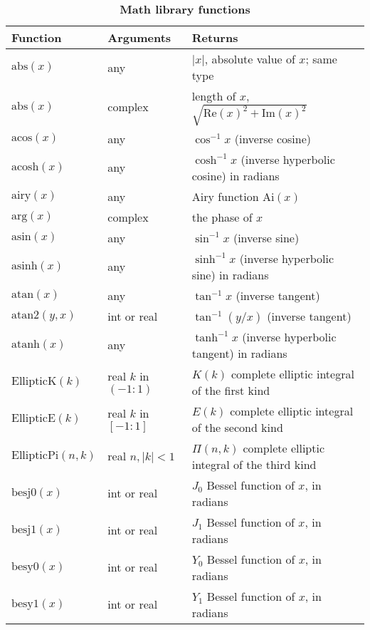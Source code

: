 \documentclass[
  hyper,    
  lang=cn,
  class=book,
  bib_index={load},
  mathSpec={envStyle=leftbar, alias},
  toc={column=2, title=目录},
]{zlatex}
\begin{document}
\begin{center}
    \begin{longtable}{lll}
        \caption{\textbf{Math library functions}}\\
        \toprule
        \textbf{Function} & \textbf{Arguments} & \textbf{Returns} \\
        \midrule
        \(\text{abs}(x)\) & any & $|x|$, absolute value of $x$; same type \\
        \(\text{abs}(x)\) & complex & length of $x$, $\sqrt{\text{Re}(x)^2 + \text{Im}(x)^2}$ \\
        \(\text{acos}(x)\) & any & $\cos^{-1} x$ (inverse cosine) \\
        \(\text{acosh}(x)\) & any & $\cosh^{-1} x$ (inverse hyperbolic cosine) in radians \\
        \(\text{airy}(x)\) & any & Airy function $\text{Ai}(x)$ \\
        \(\text{arg}(x)\) & complex & the phase of $x$ \\
        \(\text{asin}(x)\) & any & $\sin^{-1} x$ (inverse sine) \\
        \(\text{asinh}(x)\) & any & $\sinh^{-1} x$ (inverse hyperbolic sine) in radians \\
        \(\text{atan}(x)\) & any & $\tan^{-1} x$ (inverse tangent) \\
        \(\text{atan2}(y,x)\) & int or real & $\tan^{-1}(y/x)$ (inverse tangent) \\
        \(\text{atanh}(x)\) & any & $\tanh^{-1} x$ (inverse hyperbolic tangent) in radians \\
        \(\text{EllipticK}(k)\) & real  $k$ in $(-1:1)$ & $K(k)$ complete elliptic integral of the first kind \\
        \(\text{EllipticE}(k)\) & real  $k$ in $[-1:1]$ & $E(k)$ complete elliptic integral of the second kind \\
        \(\text{EllipticPi}(n,k)\) & real $n,|k|<1$ & $\Pi(n,k)$ complete elliptic integral of the third kind \\
        \(\text{besj0}(x)\) & int or real & $J_0$ Bessel function of $x$, in radians \\
        \(\text{besj1}(x)\) & int or real & $J_1$ Bessel function of $x$, in radians \\
        \(\text{besy0}(x)\) & int or real & $Y_0$ Bessel function of $x$, in radians \\
        \(\text{besy1}(x)\) & int or real & $Y_1$ Bessel function of $x$, in radians \\

\end{longtable}
\end{center}
\end{document}
